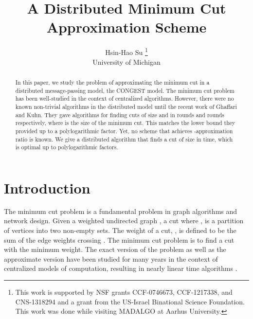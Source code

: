 \documentclass[11pt]{article}
\begin{document}
\begin{titlepage}
\title{A Distributed Minimum Cut Approximation Scheme}
\author{Hsin-Hao Su \footnote{This work is supported by NSF grants CCF-0746673, CCF-1217338, and CNS-1318294
and a grant from the US-Israel Binational Science Foundation. This work was done while visiting MADALGO at Aarhus University.}\\
University of Michigan}
\date{}
\end{titlepage}


\maketitle

\begin{abstract}
In this paper, we study the problem of approximating the minimum cut in a distributed message-passing model, the \textsf{CONGEST} model. The minimum cut problem has been well-studied in the context of centralized algorithms. However, there were no known non-trivial algorithms in the distributed model until the recent work of Ghaffari and Kuhn. They gave algorithms for finding cuts of size  and  in  rounds and  rounds respectively, where  is the size of the minimum cut. This matches the lower bound they provided up to a polylogarithmic factor. Yet, no scheme that achieves -approximation ratio is known. We give a distributed algorithm that finds a cut of size  in  time, which is optimal up to polylogarithmic factors.
\end{abstract}
\thispagestyle{empty}

\setcounter{page}{1}

\section{Introduction}
The minimum cut problem is a fundamental problem in graph algorithms and network design. Given a weighted undirected graph , a cut  where , is a partition of vertices into two non-empty sets. The weight of a cut, , is defined to be the sum of the edge weights crossing . The minimum cut problem is to find a cut with the minimum weight. The exact version of the problem as well as the approximate version have been studied for many years \cite{Karger93, KS93, Karger94b, NI92, Matula93, Gabow95, SW97, Karger2000} in the context of centralized models of computation, resulting in nearly linear time algorithms \cite{Karger2000, Matula93, Karger94b}. 
\end{document}
